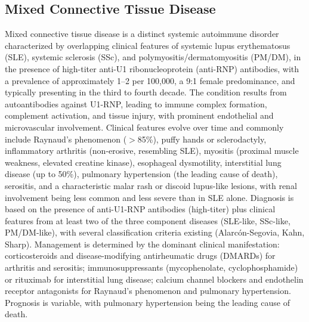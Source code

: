 \subsection{Mixed Connective Tissue Disease}
\label{sec:Mixed Connective Tissue Disease}
Mixed connective tissue disease is a distinct systemic autoimmune disorder characterized by overlapping clinical features of systemic lupus erythematosus (SLE), systemic sclerosis (SSc), and polymyositis/dermatomyositis (PM/DM), in the presence of high-titer anti-U1 ribonucleoprotein (anti-RNP) antibodies, with a prevalence of approximately 1--2 per 100,000, a 9:1 female predominance, and typically presenting in the third to fourth decade. The condition results from autoantibodies against U1-RNP, leading to immune complex formation, complement activation, and tissue injury, with prominent endothelial and microvascular involvement. Clinical features evolve over time and commonly include Raynaud's phenomenon ($>$85\%), puffy hands or sclerodactyly, inflammatory arthritis (non-erosive, resembling SLE), myositis (proximal muscle weakness, elevated creatine kinase), esophageal dysmotility, interstitial lung disease (up to 50\%), pulmonary hypertension (the leading cause of death), serositis, and a characteristic malar rash or discoid lupus-like lesions, with renal involvement being less common and less severe than in SLE alone. Diagnosis is based on the presence of anti-U1-RNP antibodies (high-titer) plus clinical features from at least two of the three component diseases (SLE-like, SSc-like, PM/DM-like), with several classification criteria existing (Alarcón-Segovia, Kahn, Sharp). Management is determined by the dominant clinical manifestation: corticosteroids and disease-modifying antirheumatic drugs (DMARDs) for arthritis and serositis; immunosuppressants (mycophenolate, cyclophosphamide) or rituximab for interstitial lung disease; calcium channel blockers and endothelin receptor antagonists for Raynaud's phenomenon and pulmonary hypertension. Prognosis is variable, with pulmonary hypertension being the leading cause of death.

